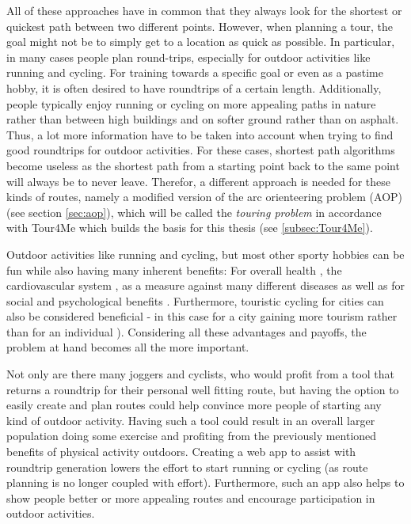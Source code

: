 All of these approaches have in common that they always look for the shortest or quickest path between two different points.
However, when planning a tour, the goal might not be to simply get to a location as quick as possible.
In particular, in many cases people plan round-trips, especially for outdoor activities like running and cycling.
For training towards a specific goal or even as a pastime hobby, it is often desired to have roundtrips of a certain length. 
Additionally, people typically enjoy running or cycling on more appealing paths in nature rather than between high buildings and on softer ground rather than on asphalt.
Thus, a lot more information have to be taken into account when trying to find good roundtrips for outdoor activities. 
For these cases, shortest path algorithms become useless as the shortest path from a starting point back to the same point will always be to never leave. 
Therefor, a different approach is needed for these kinds of routes, namely a modified version of the arc orienteering problem (AOP) (see section \ref{sec:aop}), which will be called the \textit{touring problem} in accordance with Tour4Me \cite{buchin_tour4me_2022} which builds the basis for this thesis (see \ref{subsec:Tour4Me}). 


Outdoor activities like running and cycling, but most other sporty hobbies can be fun while also having many inherent benefits: For overall health \cite{oja_health_2011, ruegsegger_health_2018, vina_exercise_2012}, the cardiovascular system \cite{nystoriak_cardiovascular_2018}, as a measure against many different diseases \cite{oja_health_2011} as well as for social \cite{mueller_jogging_2007, obrien_jogging_2007, wankel_psychological_1990} and psychological benefits \cite{biddle_psychological_1993, cekin_psychological_2015, szabo_psychological_2013, wankel_psychological_1990}. Furthermore, touristic cycling for cities can also be considered beneficial - in this case for a city gaining more tourism rather than for an individual \cite{blondiau_economic_2016}).
Considering all these advantages and payoffs, the problem at hand becomes all the more important.

Not only are there many joggers and cyclists, who would profit from a tool that returns a roundtrip for their personal well fitting route, but having the option to easily create and plan routes could help convince more people of starting any kind of outdoor activity.
Having such a tool could result in an overall larger population doing some exercise and profiting from the previously mentioned benefits of physical activity outdoors. 
Creating a web app to assist with roundtrip generation lowers the effort to start running or cycling (as route planning is no longer coupled with effort).
Furthermore, such an app also helps to show people better or more appealing routes and encourage participation in outdoor activities.

